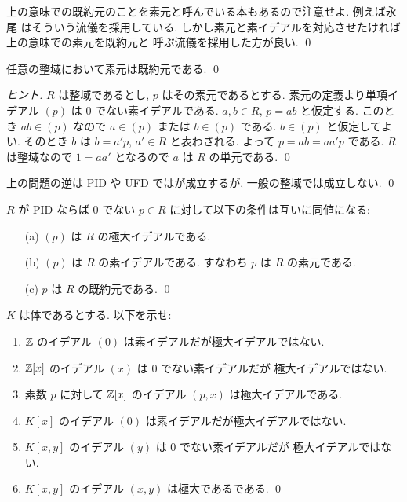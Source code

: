 \documentclass[12pt,twoside]{jarticle}
\begin{document}
\begin{rem}
 上の意味での既約元のことを素元と呼んでいる本もあるので注意せよ.
 例えば永尾 \cite{nagao-1983} はそういう流儀を採用している.
 しかし素元と素イデアルを対応させたければ上の意味での素元を既約元と
 呼ぶ流儀を採用した方が良い.
 \qed
\end{rem}

\begin{question}[任意の整域において素元は既約元, 簡単]
 \label{q:prime=>irred'}
 任意の整域において素元は既約元である. \qed
\end{question}

\begin{proof}[ヒント]
 $R$ は整域であるとし, $p$ はその素元であるとする. %
 素元の定義より単項イデアル $(p)$ は $0$ でない素イデアルである. 
 $a,b\in R$, $p=ab$ と仮定する.
 このとき $ab\in (p)$ なので $a\in(p)$ または $b\in(p)$ である.
 $b\in (p)$ と仮定してよい.
 そのとき $b$ は $b=a'p$, $a'\in R$ と表わされる. 
 よって $p=ab=aa'p$ である. 
 $R$ は整域なので $1=aa'$ となるので $a$ は $R$ の単元である.
 \qed
\end{proof}

\begin{rem}
 上の問題の逆は PID や UFD ではが成立するが, 一般の整域では成立しない.
 \qed
\end{rem}

\begin{question}
 $R$ が PID ならば $0$ でない $p\in R$ に対して以下の条件は互いに同値になる:
 \begin{enumerate}
 \item[(a)] $(p)$ は $R$ の極大イデアルである.
 \item[(b)] $(p)$ は $R$ の素イデアルである. すなわち $p$ は $R$ の素元である.
 \item[(c)] $p$ は $R$ の既約元である.
 \qed
 \end{enumerate}
\end{question}

\begin{question}[極大ではない素イデアルの例]
 $K$ は体であるとする. 以下を示せ:
 \begin{enumerate}
 \item ${\mathbb Z}$ のイデアル $(0)$ は素イデアルだが極大イデアルではない.
 \item ${\mathbb Z}[x]$ のイデアル $(x)$ は $0$ でない素イデアルだが
  極大イデアルではない.
 \item 素数 $p$ に対して ${\mathbb Z}[x]$ のイデアル $(p,x)$ は極大イデアルである.
 \item $K[x]$ のイデアル $(0)$ は素イデアルだが極大イデアルではない.
 \item $K[x,y]$ のイデアル $(y)$ は $0$ でない素イデアルだが
  極大イデアルではない.
 \item $K[x,y]$ のイデアル $(x,y)$ は極大であるである.
 \qed
 \end{enumerate}
\end{question}
\end{document}
